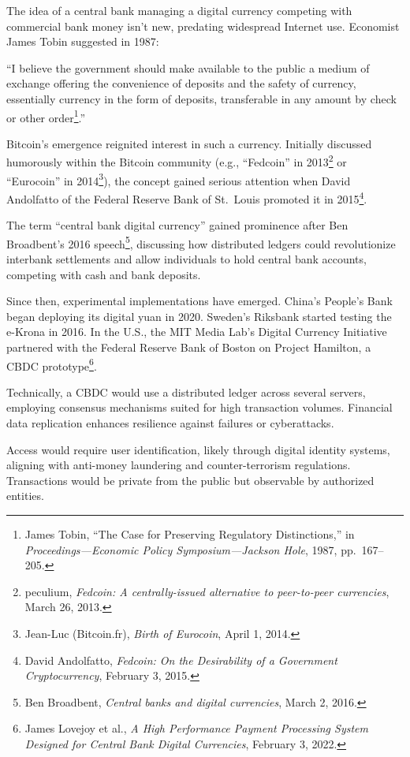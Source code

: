\documentclass[
  a5paper,
  smalldemyvopaper,10pt,twoside,onecolumn,openright,extrafontsizes,hidelinks]{memoir}
\begin{document}
The idea of a central bank managing a digital currency competing with
commercial bank money isn't new, predating widespread Internet use.
Economist James Tobin suggested in 1987:

``I believe the government should make available to the public a medium
of exchange offering the convenience of deposits and the safety of
currency, essentially currency in the form of deposits, transferable in
any amount by check or other order\footnote{James Tobin, ``The Case for
  Preserving Regulatory Distinctions,'' in \emph{Proceedings---Economic
  Policy Symposium---Jackson Hole}, 1987, pp.~167--205.}.''

Bitcoin's emergence reignited interest in such a currency. Initially
discussed humorously within the Bitcoin community (e.g., ``Fedcoin'' in
2013\footnote{peculium, \emph{Fedcoin: A centrally-issued alternative to
  peer-to-peer currencies}, March 26, 2013.} or ``Eurocoin'' in
2014\footnote{Jean-Luc (Bitcoin.fr), \emph{Birth of Eurocoin}, April 1,
  2014.}), the concept gained serious attention when David Andolfatto of
the Federal Reserve Bank of St.~Louis promoted it in 2015\footnote{David
  Andolfatto, \emph{Fedcoin: On the Desirability of a Government
  Cryptocurrency}, February 3, 2015.}.

The term ``central bank digital currency'' gained prominence after Ben
Broadbent's 2016 speech\footnote{Ben Broadbent, \emph{Central banks and
  digital currencies}, March 2, 2016.}, discussing how distributed
ledgers could revolutionize interbank settlements and allow individuals
to hold central bank accounts, competing with cash and bank deposits.

Since then, experimental implementations have emerged. China's People's
Bank began deploying its digital yuan in 2020. Sweden's Riksbank started
testing the e-Krona in 2016. In the U.S., the MIT Media Lab's Digital
Currency Initiative partnered with the Federal Reserve Bank of Boston on
Project Hamilton, a CBDC prototype\footnote{James Lovejoy et al.,
  \emph{A High Performance Payment Processing System Designed for
  Central Bank Digital Currencies}, February 3, 2022.}.

Technically, a CBDC would use a distributed ledger across several
servers, employing consensus mechanisms suited for high transaction
volumes. Financial data replication enhances resilience against failures
or cyberattacks.

Access would require user identification, likely through digital
identity systems, aligning with anti-money laundering and
counter-terrorism regulations. Transactions would be private from the
public but observable by authorized entities.
\end{document}
